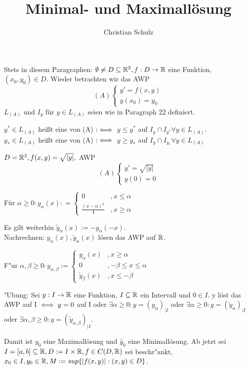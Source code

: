 \documentclass{article}
\title{Minimal- und Maximallösung}
\author{Christian Schulz}
\begin{document}
\maketitle
Stets in diesem Paragraphen: $\emptyset \ne D \subseteq \mathbb{R}^2, f:D\to\mathbb{R}$ eine Funktion, $(x_0, y_0) \in D $. Wieder betrachten wir das 
AWP  \[(A) \begin{cases} y' = f(x,y)\\ y(x_0) = y_0 \end{cases}\]
$L_{(A)} $ und $I_y$ für $ y \in L_{(A)}$ seien wie in Paragraph 22 definiert.
 
\begin{definition}
 $y^* \in L_{(A)} $ heißt eine  von (A) $:\iff$ $y \leq y^*$ auf $I_y \cap I_{y^*} \forall y \in L_{(A)}$.\\
 $y_* \in L_{(A)} $ heißt eine  von (A) $:\iff$ $y \geq y_*$ auf $I_y \cap I_{y_*} \forall y \in L_{(A)}$
\end{definition}

\begin{beispiel}
$D = \mathbb{R}^2, f(x,y) = \sqrt{|y|},$ AWP \[(A) \begin{cases} y' = \sqrt{|y|} \\ y(0) =0 \end{cases}\]

Für $\alpha \geq 0: y_{\alpha}(x) : = \begin{cases} 0 &, x \leq \alpha \\ \frac{(x-\alpha)^2}{4} &, x \geq \alpha \end{cases} $

Es gilt weiterhin $\tilde{y}_{\alpha}(x) := -y_{\alpha}(-x)$. \\
Nachrechnen: $y_{\alpha}(x), \tilde{y}_{\alpha}(x)$ lösen das AWP auf $\mathbb{R}$.

F"ur $\alpha, \beta \geq 0: y_{\alpha,\beta} := 
\begin{cases}  y_{\alpha}(x) &, x \geq \alpha \\ 0 &, -\beta \leq x \leq \alpha \\ \tilde{y}_{\beta}(x) &, x \leq -\beta  \end{cases}$

"Ubung: Sei $y: I \to \mathbb{R}$ eine Funktion, $I \subseteq \mathbb{R}$ ein Intervall und $0 \in I$.
y löst das AWP auf I $\iff y = 0$ auf I oder $\exists \alpha \geq 0: y = (y_{\alpha})_{|I}$ oder 
$\exists \alpha \geq 0: y = (\tilde{y}_{\alpha})_{|I}$ oder $\exists \alpha, \beta \geq 0: y = (\tilde{y}_{\alpha,\beta})_{|I}.$

Damit ist $y_0$ eine Maximallösung  und $\tilde{y_0}$ eine Minimallösung. 
Ab jetzt sei $I = [a,b] \subseteq \mathbb{R}, D := I \times \mathbb{R}, f \in C(D,\mathbb{R})$ sei beschr"ankt, $x_0 \in I, y_0 \in \mathbb{R}, 
M := sup\{ |f(x,y)| : (x,y) \in D \}$.
\end{beispiel}
\end{document}
